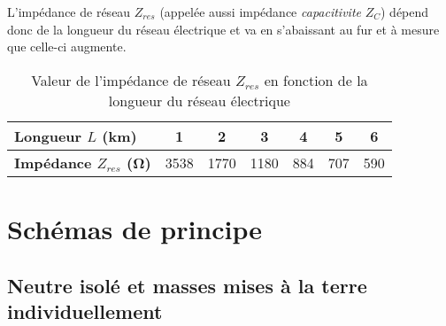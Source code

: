 \begin{figure}[H]
\caption{Impédance de fuite $Z_{res}$ d'un réseau électrique de plusieurs \si{\kilo\meter}}
\begin{subfigure}[t]{0.49\linewidth}

\end{subfigure}
\begin{subfigure}[t]{0.49\linewidth}

\end{subfigure}
\end{figure}

L'impédance de réseau $Z_{res}$ (appelée aussi impédance \emph{capacitivite} $Z_C$) dépend donc de la longueur du réseau électrique et va en s'abaissant au fur et à mesure que celle-ci augmente.

\begin{table}[h]
\caption{Valeur de l'impédance de réseau $Z_{res}$ en fonction de la longueur du réseau électrique}
\begin{tabular}{l c c c c c c}
\toprule
{\small \textbf{Longueur $L$ (\si{\kilo\meter})}} & 1 & 2 & 3 & 4 & 5 & 6 \\
\midrule
{\small \textbf{Impédance $Z_{res}$  (\si{\ohm})}} & 3538 & 1770 & 1180 & 884 & 707 & 590 \\
\bottomrule
\end{tabular}
\end{table}

\section{Schémas de principe}

\subsection{Neutre isolé et masses mises à la terre individuellement}


